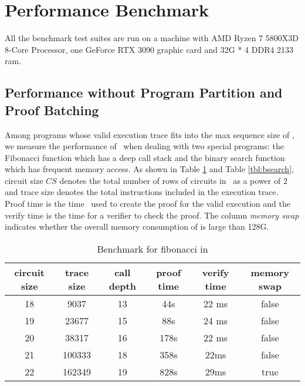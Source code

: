 \section{Performance Benchmark}
\label{chp:performance}
All the benchmark test suites are run on a machine with AMD Ryzen 7 5800X3D 8-Core Processor, one GeForce RTX 3090 graphic card and 32G * 4 DDR4 2133 ram.

\subsection{Performance without Program Partition and Proof Batching}
Among programs whose valid execution trace fits into the max sequence size of \zkwasm, we measure the performance of \zkwasm\, when dealing with two special programs: the Fibonacci function which has a deep call stack and the binary search function which has frequent memory access. As shown in Table \ref{tbl:fib} and Table \ref{tbl:bsearch}, circuit size $CS$ denotes the total number of rows of circuits in \zkwasm\, as a power of $2$ and trace size denotes the total instructions included in the execution trace. Proof time is the time \zkwasm\, used to create the proof for the valid execution and the verify time is the time for a verifier to check the proof. The column \emph{memory swap} indicates whether the overall memory consumption of \zkwasm is large than 128G.
\begin{table}[!h]
\small
\begin{center}
\caption{Benchmark for fibonacci in \zkwasm}
\label{tbl:fib}
\begin{tabular}{ | c | c | c | c | c| c| }
  \hline
  circuit size & trace size & call depth & proof time & verify time & memory swap\\ 
  \hline
  18 & 9037 & 13 & 44s & 22 ms & false\\
  \hline
    19 & 23677 & 15 & 88s & 24 ms & false \\
  \hline
    20 & 38317 & 16 & 178s & 22 ms & false \\
  \hline
    21 & 100333 & 18 & 358s & 22ms & false\\
  \hline
    22 & 162349 & 19 & 828s & 29ms & true \\
  \hline
\end{tabular}

\end{center}
\end{table}

